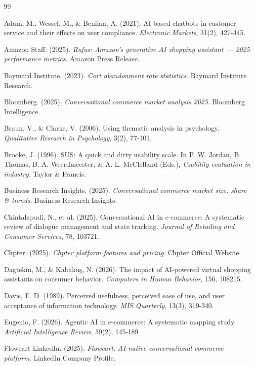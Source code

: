 \documentclass[12pt,a4paper]{article}
\begin{document}

\begin{thebibliography}{99}

Adam, M., Wessel, M., \& Benlian, A. (2021). AI-based chatbots in customer service and their effects on user compliance. \textit{Electronic Markets}, 31(2), 427-445.

Amazon Staff. (2025). \textit{Rufus: Amazon's generative AI shopping assistant --- 2025 performance metrics}. Amazon Press Release.

Baymard Institute. (2023). \textit{Cart abandonment rate statistics}. Baymard Institute Research.

Bloomberg. (2025). \textit{Conversational commerce market analysis 2025}. Bloomberg Intelligence.

Braun, V., \& Clarke, V. (2006). Using thematic analysis in psychology. \textit{Qualitative Research in Psychology}, 3(2), 77-101.

Brooke, J. (1996). SUS: A quick and dirty usability scale. In P. W. Jordan, B. Thomas, B. A. Weerdmeester, \& A. L. McClelland (Eds.), \textit{Usability evaluation in industry}. Taylor \& Francis.

Business Research Insights. (2025). \textit{Conversational commerce market size, share \& trends}. Business Research Insights.

Chintalapudi, N., et al. (2025). Conversational AI in e-commerce: A systematic review of dialogue management and state tracking. \textit{Journal of Retailing and Consumer Services}, 78, 103721.

Chpter. (2025). \textit{Chpter platform features and pricing}. Chpter Official Website.

Dagtekin, M., \& Kabakuş, N. (2026). The impact of AI-powered virtual shopping assistants on consumer behavior. \textit{Computers in Human Behavior}, 156, 108215.

Davis, F. D. (1989). Perceived usefulness, perceived ease of use, and user acceptance of information technology. \textit{MIS Quarterly}, 13(3), 319-340.

Eugenio, F. (2026). Agentic AI in e-commerce: A systematic mapping study. \textit{Artificial Intelligence Review}, 59(2), 145-189.

Flowcart LinkedIn. (2025). \textit{Flowcart: AI-native conversational commerce platform}. LinkedIn Company Profile.


\end{thebibliography}
\end{document}
